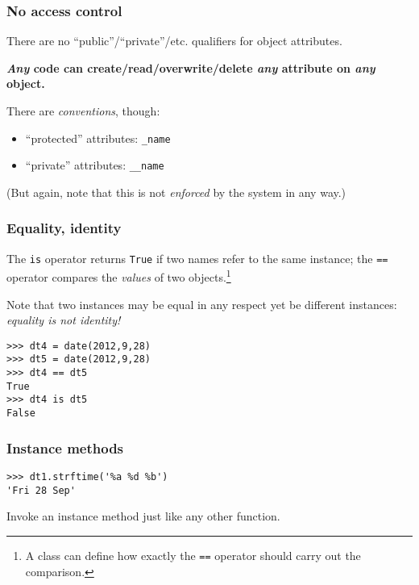 \documentclass[english,serif,mathserif,xcolor=pdftex,dvipsnames,table]{beamer}
\begin{document}
\begin{frame}
  \frametitle{No access control}
  There are no ``public''/``private''/etc. qualifiers for object
  attributes.

  \+
  \textbf{\emph{Any} code can create/read/overwrite/delete \emph{any} attribute on
    \emph{any} object.}

  \+
  There are \emph{conventions}, though:
  \begin{itemize}
  \item ``protected'' attributes: \texttt{\_name}
  \item ``private'' attributes: \texttt{\_\_name}
  \end{itemize}
  (But again, note that this is not \emph{enforced} by the system in
  any way.)

\end{frame}


\begin{frame}
  \frametitle{Equality, identity}
  The \texttt{is} operator returns \texttt{True} if two names refer to
  the same instance; the \texttt{==} operator compares the
  \emph{values} of two objects.\footnote{A class can define how
    exactly the \texttt{==} operator should carry out the comparison.}

  \+
  Note that two instances may be equal in any respect yet be
  different instances: \emph{equality is not identity!}
\begin{lstlisting}
>>> dt4 = date(2012,9,28)
>>> dt5 = date(2012,9,28)
>>> dt4 == dt5
True
>>> dt4 is dt5
False
\end{lstlisting}
\end{frame}


\begin{frame}[fragile]
  \frametitle{Instance methods}
\begin{lstlisting}[showstringspaces=false]
>>> dt1.strftime('%a %d %b')
'Fri 28 Sep'
\end{lstlisting}

  \+ 
  Invoke an instance method just like any other function.
\end{frame}
\end{document}
